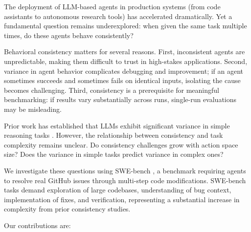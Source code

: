 \documentclass{article}
\begin{document}
The deployment of LLM-based agents in production systems (from code assistants to autonomous research tools) has accelerated dramatically. Yet a fundamental question remains underexplored: when given the same task multiple times, do these agents behave consistently?

Behavioral consistency matters for several reasons. First, inconsistent agents are unpredictable, making them difficult to trust in high-stakes applications. Second, variance in agent behavior complicates debugging and improvement; if an agent sometimes succeeds and sometimes fails on identical inputs, isolating the cause becomes challenging. Third, consistency is a prerequisite for meaningful benchmarking: if results vary substantially across runs, single-run evaluations may be misleading.

Prior work has established that LLMs exhibit significant variance in simple reasoning tasks \citep{mehta2026agents}. However, the relationship between consistency and task complexity remains unclear. Do consistency challenges grow with action space size? Does the variance in simple tasks predict variance in complex ones?

We investigate these questions using SWE-bench \citep{swebench}, a benchmark requiring agents to resolve real GitHub issues through multi-step code modifications. SWE-bench tasks demand exploration of large codebases, understanding of bug context, implementation of fixes, and verification, representing a substantial increase in complexity from prior consistency studies.

Our contributions are:
\end{document}
